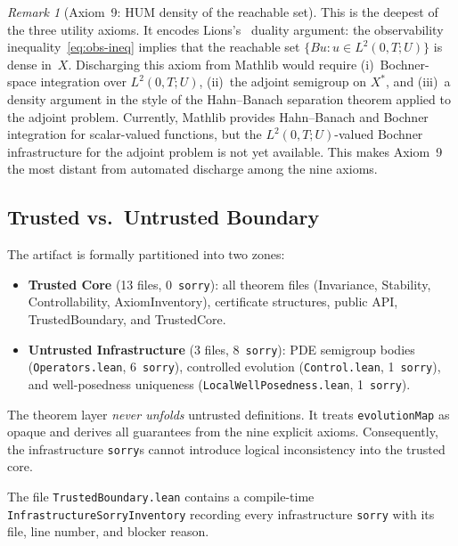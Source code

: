 \documentclass[11pt,a4paper]{article}
\theoremstyle{plain}
\theoremstyle{definition}
\theoremstyle{remark}
\newtheorem{remark}[theorem]{Remark}
\newcommand{\sorry}{\texttt{sorry}}
\newcommand{\leaninline}[1]{\texttt{#1}}
\begin{document}
\begin{remark}[Axiom~9: HUM density of the reachable set]\label{rem:ax9}
This is the deepest of the three utility axioms.  It encodes
Lions's~\cite{Lions1988} duality argument: the observability
inequality~\eqref{eq:obs-ineq} implies that the reachable set
$\{Bu : u \in L^2(0,T; U)\}$ is dense in~$X$.  Discharging this axiom
from Mathlib would require (i)~Bochner-space integration over
$L^2(0,T; U)$, (ii)~the adjoint semigroup on $X^*$, and
(iii)~a density argument in the style of the Hahn--Banach separation
theorem applied to the adjoint problem.  Currently, Mathlib provides
Hahn--Banach and Bochner integration for scalar-valued functions, but
the $L^2(0,T; U)$-valued Bochner infrastructure for the adjoint
problem is not yet available.  This makes Axiom~9 the most distant
from automated discharge among the nine axioms.
\end{remark}

\subsection{Trusted vs.\ Untrusted Boundary}

The artifact is formally partitioned into two zones:

\begin{itemize}
  \item \textbf{Trusted Core} (13 files, 0~\sorry{}):
    all theorem files (Invariance, Stability, Controllability,
    AxiomInventory), certificate structures, public API,
    TrustedBoundary, and TrustedCore.
  \item \textbf{Untrusted Infrastructure} (3 files, 8~\sorry{}):
    PDE semigroup bodies (\texttt{Operators.lean}, 6~\sorry{}),
    controlled evolution (\texttt{Control.lean}, 1~\sorry{}), and
    well-posedness uniqueness (\texttt{LocalWellPosedness.lean}, 1~\sorry{}).
\end{itemize}

The theorem layer \emph{never unfolds} untrusted definitions.  It treats
\leaninline{evolutionMap} as opaque and derives all guarantees from the
nine explicit axioms.  Consequently, the infrastructure \sorry{}s cannot
introduce logical inconsistency into the trusted core.

The file \leaninline{TrustedBoundary.lean} contains a compile-time
\leaninline{InfrastructureSorryInventory} recording every infrastructure
\sorry{} with its file, line number, and blocker reason.


\end{document}
